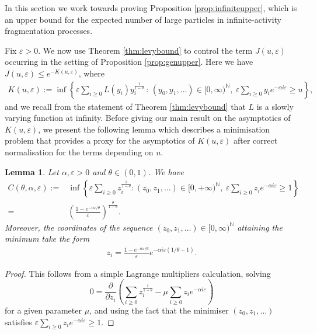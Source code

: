 \documentclass[a4,12pt]{amsart}
\numberwithin{equation}{section}
\newtheorem{lemma}[thm]{Lemma}
\begin{document}
	In this section we work towards proving Proposition \ref{prop:infiniteupper}, 
	which is an upper bound for the expected number of large particles in 
	infinite-activity fragmentation processes.
    
	Fix $\varepsilon > 0$.
	We now use Theorem \ref{thm:levybound} to control the term $J(u,\varepsilon)$ occurring in 
	the setting of Proposition \ref{prop:genupper}. Here we have $J(u,\varepsilon) \leq e^{ - K(u,\varepsilon)}$, where
	\begin{align} \label{eq:Kdef}
		K(u,\varepsilon) := 
		\inf \left\{  \varepsilon 
		\sum_{ i \geq 0}  
   L\left(y_i\right)
        y_i^{\frac{1}{1-\theta}}  
		\,:\, (y_0,y_1,\ldots)\in[0,\infty)^{\mathbb{N}}, \:
		\varepsilon \sum_{ i \geq 0} y_i e^{ - \alpha i \varepsilon } 
		\geq u \right\},
	\end{align}
	and we recall from the statement of Theorem \ref{thm:levybound} that $L$ is 
	a slowly varying function at infinity. 
	Before giving our main result on the asymptotics of $K(u,\varepsilon)$,  we present the following 
	lemma which describes a minimisation problem that provides a proxy for the asymptotics 
	of $K(u,\varepsilon)$ after correct normalisation for the terms depending on $u$. 

	\begin{lemma} \label{lem:simple}
	Let $\alpha,\varepsilon > 0$ and $\theta \in (0,1)$. We have 
		\begin{align*}
			C(\theta,\alpha,\varepsilon)  :=& 
			\inf \left\{  \varepsilon \sum_{ i \geq 0}  z_i^{\frac{1}{1-\theta}}  
				: (z_0,z_1,\ldots) \in [0, +\infty)^\mathbb{N}, \:
			\varepsilon \sum_{ i \geq 0} z_i e^{ - \alpha i \varepsilon } 
			\geq 1 \right\}\\ 
			=&  \left( \frac{1-e^{ - \alpha \varepsilon/\theta} }{ \varepsilon} \right)^{\frac{\theta}{1-\theta}}.
		\end{align*}
		Moreover, the coordinates of the sequence 
		$(z_0,z_1,\ldots)\in[0,\infty)^{\mathbb{N}} $ attaining the minimum take the form
		\begin{align*}
			z_i = \frac{1-e^{- \alpha  \varepsilon/\theta}}{\varepsilon} 
			e^{ - \alpha i \varepsilon(1/\theta-1)}.
		\end{align*}
	\end{lemma}

	\begin{proof}
		This follows from a simple Lagrange multipliers calculation, 
		solving 
		\begin{equation*}
			0 = \frac{\partial}{ \partial z_i} 
			\left(\sum_{ i \geq 0}  z_i^{\frac{1}{1-\theta}}  
			- \mu \sum_{i \geq 0} z_i e^{ - \alpha i \varepsilon } \right)
		\end{equation*}
		for a given parameter $\mu$, and using the fact
		that the minimiser $(z_0,z_1,\ldots)$ satisfies 
		$\varepsilon \sum_{ i \geq 0} z_i e^{ - \alpha i \varepsilon } \geq 1$.
	\end{proof}
\end{document}

